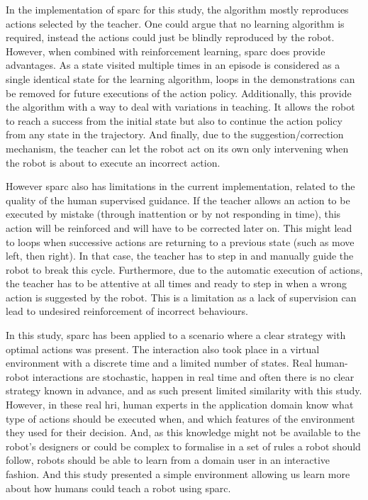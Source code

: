 In the implementation of \gls{sparc} for this study, the algorithm mostly reproduces actions selected by the teacher. One could argue that no learning algorithm is required, instead the actions could just be blindly reproduced by the robot. However, when combined with reinforcement learning, \gls{sparc} does provide advantages. As a state visited multiple times in an episode is considered as a single identical state for the learning algorithm, loops in the demonstrations can be removed for future executions of the action policy. Additionally, this provide the algorithm with a way to deal with variations in teaching. It allows the robot to reach a success from the initial state but also to continue the action policy from any state in the trajectory. And finally, due to the suggestion/correction mechanism, the teacher can let the robot act on its own only intervening when the robot is about to execute an incorrect action. 


However \gls{sparc} also has limitations in the current implementation, related to the quality of the human supervised guidance. If the teacher allows an action to be executed by mistake (through inattention or by not responding in time), this action will be reinforced and will have to be corrected later on. This might lead to loops when successive actions are returning to a previous state (such as move left, then right). In that case, the teacher has to step in and manually guide the robot to break this cycle. Furthermore, due to the automatic execution of actions, the teacher has to be attentive at all times and ready to step in when a wrong action is suggested by the robot. This is a limitation as a lack of supervision can lead to undesired reinforcement of incorrect behaviours.

In this study, \gls{sparc} has been applied to a scenario where a clear strategy with optimal actions was present. The interaction also took place in a virtual environment with a discrete time and a limited number of states. Real human-robot interactions are stochastic, happen in real time and often there is no clear strategy known in advance, and as such present limited similarity with this study. However, in these real \gls{hri}, human experts in the application domain know what type of actions should be executed when, and which features of the environment they used for their decision. And, as this knowledge might not be available to the robot's designers or could be complex to formalise in a set of rules a robot should follow, robots should be able to learn from a domain user in an interactive fashion. And this study presented a simple environment allowing us learn more about how humans could teach a robot using \gls{sparc}.

